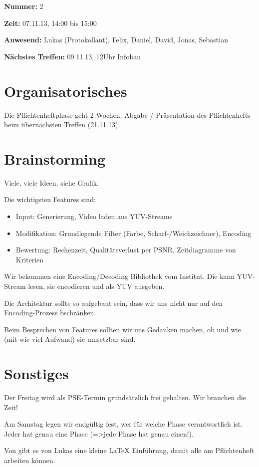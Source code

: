 \documentclass[a4paper]{article}
\begin{document}
\textbf{Nummer:} 2

\textbf{Zeit:} 07.11.13, 14:00 bis 15:00

\textbf{Anwesend:} Lukas (Protokollant), Felix, Daniel, David, Jonas, Sebastian

\textbf{Nächstes Treffen:} 09.11.13, 12Uhr Infobau

\section{Organisatorisches}

Die Pflichtenheftphase geht 2 Wochen. Abgabe / Präsentation des Pflichtenhefts beim übernächsten Treffen (21.11.13).

\section{Brainstorming}

Viele, viele Ideen, siehe Grafik.

Die wichtigsten Features sind:
\begin{itemize}
	\item Input: Generierung, Video laden aus YUV-Streams
	\item Modifikation: Grundlegende Filter (Farbe, Scharf-/Weichzeichner), Encoding
	\item Bewertung: Rechenzeit, Qualitätsverlust per PSNR, Zeitdiagramme von Kriterien
\end{itemize}

Wir bekommen eine Encoding/Decoding Bibliothek vom Institut. Die kann YUV-Stream lesen, sie encodieren und als YUV ausgeben.

Die Architektur sollte so aufgebaut sein, dass wir uns nicht nur auf den Encoding-Prozess bschränken.

Beim Besprechen von Features sollten wir uns Gedanken machen, ob und wie (mit wie viel Aufwand) sie umsetzbar sind.

\section{Sonstiges}

Der Freitag wird als PSE-Termin grundsätzlich frei gehalten. Wir brauchen die Zeit!

Am Samstag legen wir endgültig fest, wer für welche Phase verantwortlich ist. Jeder hat genau eine Phase (=\textgreater jede Phase hat genau einen!).

Von gibt es von Lukas eine kleine \LaTeX{} Einführung, damit alle am Pflichtenheft arbeiten können.
\end{document}
